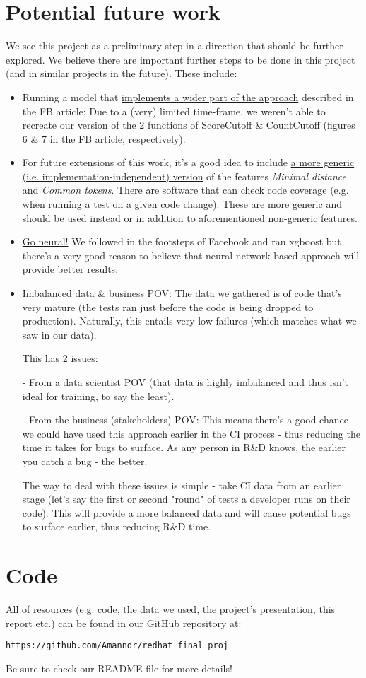 \documentclass{article}
\begin{document}
\section{Potential future work}
We see this project as a preliminary step in a direction that should be further explored. We believe  there are important further steps to be done in this project (and in similar projects in the future). These include:
\begin{itemize}
    \item Running a model that \underline{implements a wider part of the approach} described in the FB article; Due to a (very) limited time-frame, we weren't able to recreate our version of the 2 functions of ScoreCutoff \& CountCutoff (figures 6 \& 7 in the FB article, respectively).
    \item For future extensions of this work, it's a good idea to include \ul{a more generic (i.e. implementation-independent) version} of the features \textit{Minimal distance} and \textit{Common tokens}. There are software that can check code coverage (e.g. when running a test on a given code change). These are more generic and should be used instead or in addition to aforementioned non-generic features.
    \item \underline{Go neural!} We followed in the footsteps of Facebook and ran xgboost but there's a very good reason to believe that neural network based approach will provide better results.
    \item \underline{Imbalanced data \& business POV}: The data we gathered is of code that's very mature (the tests ran just before the code is being dropped to production). Naturally, this entails very low failures (which matches what we saw in our data).
    
    This has 2 issues:
    
 - From a data scientist POV (that data is highly imbalanced and thus isn't ideal for training, to say the least).
 
 - From the business (stakeholders) POV: This means there's a good chance we could have used this approach earlier in the CI process - thus reducing the time it takes for bugs to surface. As any person in R\&D knows, the earlier you catch a bug - the better.
 
 The way to deal with these issues is simple - take CI data from an earlier stage (let's say the first or second "round" of tests a developer runs on their code). This will provide a more balanced data and will cause potential bugs to surface earlier, thus reducing R\&D time.
\end{itemize}


\section{Code}

All of resources (e.g. code, the data we used, the project's presentation, this report etc.) can be found in our GitHub repository at:
\begin{verbatim}
https://github.com/Amannor/redhat_final_proj
 \end{verbatim}
Be sure to check our README file for more details!



\end{document}
